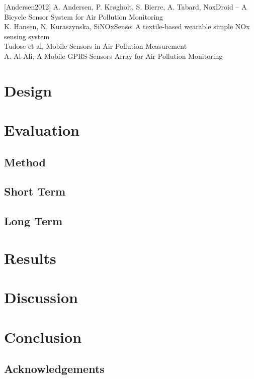 \documentclass{ituthesis}
\begin{document}
[Andersen2012] A. Andersen, P. Krøgholt, S. Bierre, A. Tabard, NoxDroid – A Bicycle Sensor System for Air Pollution Monitoring\\

\cite{hansen2010sinox} \cite{hansen2012sinoxsense} K. Hansen, N. Kuraszynska, SiNOxSense: A textile-based wearable simple NOx sensing system\\

\cite{tudose2011mobile} Tudose et al, Mobile Sensors in Air Pollution Measurement\\

\cite{al2010mobile} A. Al-Ali, A Mobile GPRS-Sensors Array for Air Pollution Monitoring\\

\chapter{Design}
\label{ch:design}

\chapter{Evaluation}
\label{ch:evaluation}

	\section{Method}
	\label{sec:evaluation_method}

	\section{Short Term}
	\label{sec:evaluation_short}

	\section{Long Term}
	\label{sec:evaluation_long}

\chapter{Results}
\label{ch:results}

\chapter{Discussion}
\label{ch:discussion}

\chapter{Conclusion}
\label{ch:conclusion}

	\section{Acknowledgements}
	\label{sec:acknowledgements}

\clearpage


\end{document}
